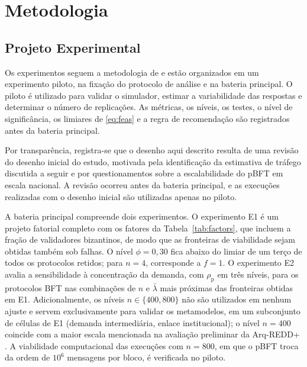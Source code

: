 \section{Metodologia}
\label{sec:method}

\subsection{Projeto Experimental}

Os experimentos seguem a metodologia de \citet{Jain1991} e estão organizados em um experimento piloto, na fixação do protocolo de análise e na bateria principal. O piloto é utilizado para validar o simulador, estimar a variabilidade das respostas e determinar o número de replicações. As métricas, os níveis, os testes, o nível de significância, os limiares de \eqref{eq:feas} e a regra de recomendação são registrados antes da bateria principal.

Por transparência, registra-se que o desenho aqui descrito resulta de uma revisão do desenho inicial do estudo, motivada pela identificação da estimativa de tráfego discutida a seguir e por questionamentos sobre a escalabilidade do pBFT em escala nacional. A revisão ocorreu antes da bateria principal, e as execuções realizadas com o desenho inicial são utilizadas apenas no piloto. 

A bateria principal compreende dois experimentos. O experimento E1 é um projeto fatorial completo com os fatores da Tabela~\ref{tab:factors}, que incluem a fração de validadores bizantinos, de modo que as fronteiras de viabilidade sejam obtidas também sob falhas. O nível $\phi = 0{,}30$ fica abaixo do limiar de um terço de todos os protocolos retidos; para $n = 4$, corresponde a $f = 1$. O experimento E2 avalia a sensibilidade à concentração da demanda, com $\rho_{\mathrm{p}}$ em três níveis, para os protocolos BFT nas combinações de $n$ e $\bar{\lambda}$ mais próximas das fronteiras obtidas em E1. Adicionalmente, os níveis $n \in \{400, 800\}$ não são utilizados em nenhum ajuste e servem exclusivamente para validar os metamodelos, em um subconjunto de células de E1 (demanda intermediária, enlace institucional); o nível $n = 400$ coincide com a maior escala mencionada na avaliação preliminar da Arq-REDD+ . A viabilidade computacional das execuções com $n = 800$, em que o pBFT troca da ordem de $10^{6}$ mensagens por bloco, é verificada no piloto.

